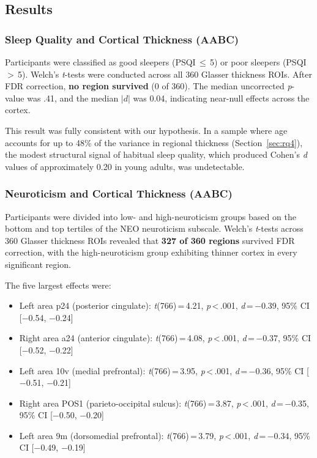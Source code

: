 \subsection{Results}

\subsubsection{Sleep Quality and Cortical Thickness (AABC)}

Participants were classified as good sleepers (PSQI\,$\leq$\,5) or poor sleepers (PSQI\,$>$\,5).
Welch's \textit{t}-tests were conducted across all 360 Glasser thickness ROIs.
After FDR correction, \textbf{no region survived} (0 of 360).
The median uncorrected \textit{p}-value was .41, and the median $|d|$ was 0.04, indicating near-null effects across the cortex.

This result was fully consistent with our hypothesis.
In a sample where age accounts for up to 48\% of the variance in regional thickness (Section~\ref{sec:rq4}), the modest structural signal of habitual sleep quality, which produced Cohen's \textit{d} values of approximately 0.20 in young adults, was undetectable.

\subsubsection{Neuroticism and Cortical Thickness (AABC)}

Participants were divided into low- and high-neuroticism groups based on the bottom and top tertiles of the NEO neuroticism subscale.
Welch's \textit{t}-tests across 360 Glasser thickness ROIs revealed that \textbf{327 of 360 regions} survived FDR correction, with the high-neuroticism group exhibiting thinner cortex in every significant region.

The five largest effects were:
\begin{itemize}[nosep]
  \item Left area p24 (posterior cingulate): \textit{t}(766)\,=\,4.21, \textit{p}\,<\,.001, \textit{d}\,=\,$-$0.39, 95\% CI [$-$0.54, $-$0.24]
  \item Right area a24 (anterior cingulate): \textit{t}(766)\,=\,4.08, \textit{p}\,<\,.001, \textit{d}\,=\,$-$0.37, 95\% CI [$-$0.52, $-$0.22]
  \item Left area 10v (medial prefrontal): \textit{t}(766)\,=\,3.95, \textit{p}\,<\,.001, \textit{d}\,=\,$-$0.36, 95\% CI [$-$0.51, $-$0.21]
  \item Right area POS1 (parieto-occipital sulcus): \textit{t}(766)\,=\,3.87, \textit{p}\,<\,.001, \textit{d}\,=\,$-$0.35, 95\% CI [$-$0.50, $-$0.20]
  \item Left area 9m (dorsomedial prefrontal): \textit{t}(766)\,=\,3.79, \textit{p}\,<\,.001, \textit{d}\,=\,$-$0.34, 95\% CI [$-$0.49, $-$0.19]
\end{itemize}

